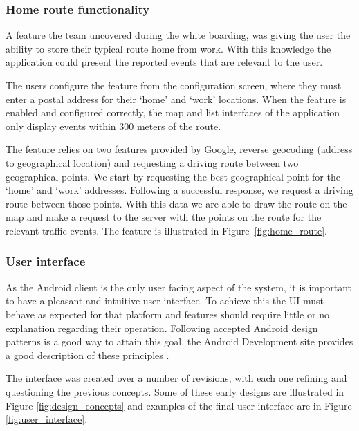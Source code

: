 \subsubsection{Home route functionality}
A feature the team uncovered during the white boarding, was giving the user the
ability to store their typical route home from work. With this knowledge the
application could present the reported events that are relevant to the user.

The users configure the feature from the configuration screen, where they must
enter a postal address for their `home' and `work' locations. When the feature
is enabled and configured correctly, the map and list interfaces of the
application only display events within 300 meters of the route.

The feature relies on two features provided by Google, reverse geocoding
(address to geographical location) and requesting a driving route between two
geographical points. We start by requesting the best geographical point for the
`home' and `work' addresses. Following a successful response, we request a
driving route between those points. With this data we are able to draw the
route on the map and make a request to the server with the points on the route
for the relevant traffic events. The feature is illustrated in Figure~\ref{fig:home_route}.

\subsubsection{User interface}
As the Android client is the only user facing aspect of the system, it is
important to have a pleasant and intuitive user interface. To achieve this the
UI must behave as expected for that platform and features should require little
or no explanation regarding their operation. Following accepted Android design
patterns is a good way to attain this goal, the Android Development site
provides a good description of these principles \cite{website:android_ui}.

The interface was created over a number of revisions, with each one refining
and questioning the previous concepts. Some of these early designs are illustrated in
Figure \ref{fig:design_concepts} and examples of the final  user interface are in Figure
\ref{fig:user_interface}.
